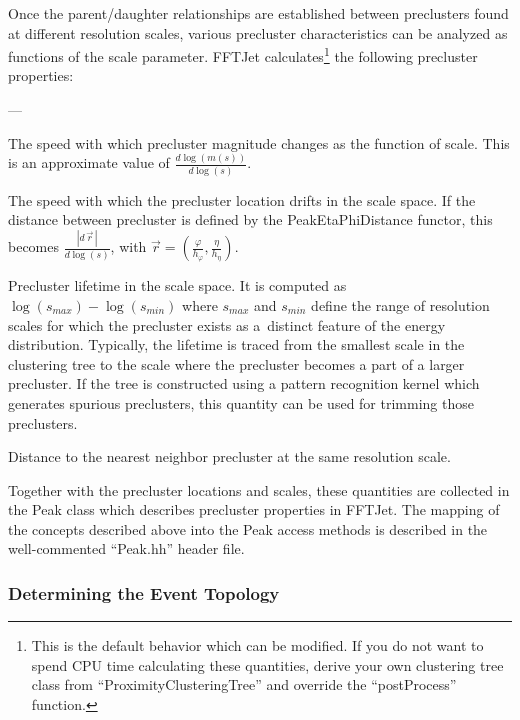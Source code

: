 \documentclass[epsf,12pt,titlepage]{article}
\newcommand{\cname}[1]{\index{#1}\textsf{#1}}
\newenvironment{thinlist} {
    \begin{list} {---} {
        \setlength{\topsep}{0.075cm}
        \setlength{\parsep}{0.075cm}
        \setlength{\itemsep}{0.075cm}
    }
} {\end{list}}
\begin{document}
Once the parent/daughter relationships are established between
preclusters found at different resolution scales, various precluster
characteristics can be analyzed as functions of the scale parameter.
FFTJet calculates\footnote{This is the default behavior
which can be modified. If you do not want to spend CPU
time calculating these quantities, derive your own clustering tree
class from ``ProximityClusteringTree'' and override the ``postProcess''
function.} the following precluster properties:
\begin{thinlist}
\item The speed with which precluster magnitude changes as the function of scale. This is an approximate value of $\frac{d \log(m(s))}{d \log(s)}$.
\item The speed with which the precluster location drifts in the scale space. If the distance between precluster is defined by the \cname{PeakEtaPhiDistance} functor,
this becomes $\frac{|d\,\vec{r}\,|}{d \log(s)}$, with
$\vec{r} = (\frac{\varphi}{h_{\varphi}}, \frac{\eta}{h_{\eta}})$.
\item Precluster lifetime in the scale space. It is computed as
$\log(s_{max}) - \log(s_{min})$
where $s_{max}$ and $s_{min}$ define
the range of resolution scales for which the
precluster exists as a~distinct feature of the energy
distribution. Typically, the lifetime is traced
from the smallest scale in the clustering tree
to the scale where the precluster becomes
a part of a larger precluster. If the tree is
constructed using a pattern recognition kernel which generates
spurious preclusters, this quantity can be used for trimming
those preclusters.
\item Distance to the nearest neighbor precluster at the same resolution scale.
\end{thinlist}
Together with the precluster locations and scales, these quantities
are collected in the \cname{Peak} class which describes precluster
properties in FFTJet. The mapping of the concepts described above
into the \cname{Peak} access methods is described in the 
well-commented ``Peak.hh'' header file.

\subsubsection{Determining the Event Topology}
\label{sec:strategies}
\end{document}
